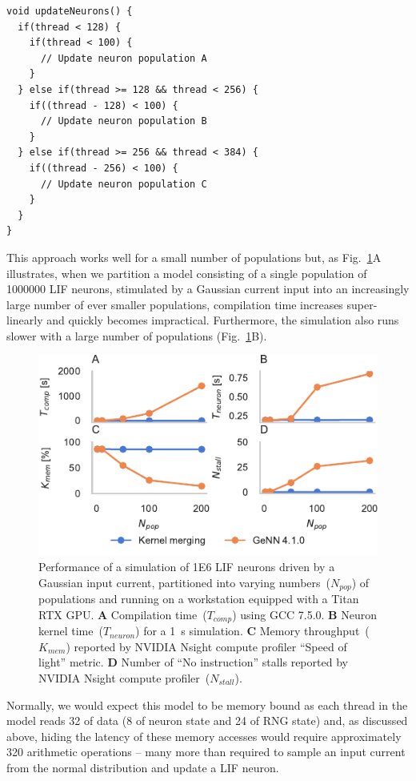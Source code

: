 \documentclass[9pt,a4paper]{amsart}
\begin{document}
\begin{lstlisting}
void updateNeurons() {
  if(thread < 128) {
    if(thread < 100) {
      // Update neuron population A
    }
  } else if(thread >= 128 && thread < 256) {
    if((thread - 128) < 100) {
      // Update neuron population B
    }
  } else if(thread >= 256 && thread < 384) {
    if((thread - 256) < 100) {
      // Update neuron population C
    }
  }
}
\end{lstlisting}
%
This approach works well for a small number of populations but, as Fig.~\ref{fig:merging_scaling}A illustrates, when we partition a model consisting of a single population of \num{1000000} LIF neurons, stimulated by a Gaussian current input into an increasingly large number of ever smaller populations, compilation time increases super-linearly and quickly becomes impractical.
Furthermore, the simulation also runs slower with a large number of populations (Fig.~\ref{fig:merging_scaling}B).
%
\begin{figure}
    \centering
    \includegraphics{figures/merging_scaling}
    \caption{Performance of a simulation of \num{1E6} LIF neurons driven by a Gaussian input current, partitioned into varying numbers~($N_{pop}$) of populations and running on a workstation equipped with a Titan RTX GPU.
    \textbf{A} Compilation time~($T_{comp}$) using GCC 7.5.0.
    \textbf{B} Neuron kernel time~($T_{neuron}$) for a \SI{1}{\second} simulation.
    \textbf{C} Memory throughput~($K_{mem}$) reported by NVIDIA Nsight compute profiler ``Speed of light'' metric.
    \textbf{D} Number of ``No instruction'' stalls reported by NVIDIA Nsight compute profiler~($N_{stall}$).}
    \label{fig:merging_scaling}
\end{figure}
%
Normally, we would expect this model to be memory bound as each thread in the model reads \SI{32}{\byte} of data (\SI{8}{\byte} of neuron state and \SI{24}{\byte} of RNG state) and, as discussed above, hiding the latency of these memory accesses would require approximately 320 arithmetic operations -- many more than required to sample an input current from the normal distribution and update a LIF neuron.
\end{document}
